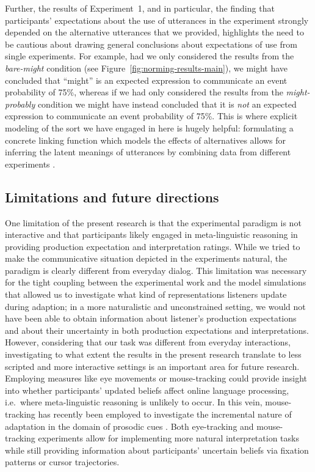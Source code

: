 \documentclass[man, floatsintext]{apa6}
\newcommand{\figref}[1]{Figure~\ref{#1}}
\begin{document}
Further, the results of Experiment~1, and in particular, the finding
that participants' expectations about the use of utterances in the experiment strongly depended on
the alternative utterances that we provided, highlights the need to be cautious about drawing general conclusions about expectations of use from single experiments. For example,
had we only considered the results from the \textit{bare-might} condition (see \figref{fig:norming-results-main}),
we might have concluded that ``might'' is an expected expression to communicate an event probability of 75\%,
whereas if we had only considered the results from the \textit{might-probably} condition we might have instead concluded that it is \emph{not} an expected expression to communicate an event probability of 75\%.
This is where explicit modeling of the sort we have engaged in here is hugely helpful: formulating a concrete linking function which models the effects of 
alternatives allows for inferring the latent meanings of utterances by combining data from different experiments \parencite[see also][for similar approaches]{Franke2014,Peloquin2016}.

\subsection{Limitations and future directions}

One limitation of the present research is that the experimental paradigm is not interactive and that participants likely engaged in meta-linguistic reasoning in providing production expectation and interpretation ratings. While we tried to make the communicative situation depicted in the experiments natural,
the paradigm is clearly different from everyday dialog. This limitation was necessary for the tight coupling between the experimental work
and the model simulations that allowed us to investigate what kind of representations listeners update during adaption; in a more
naturalistic and unconstrained setting, we would not have been able to obtain information about listener's production expectations and about their
uncertainty in both production expectations and interpretations. However, considering that our task was different from everyday interactions, investigating
to what extent the results in the present research translate to less scripted and more interactive settings is an important area for future research. Employing measures like eye movements or mouse-tracking could provide insight into whether participants' updated beliefs affect online language processing, i.e.~where meta-linguistic reasoning is unlikely to occur. In this vein, mouse-tracking has recently been
employed  to investigate the incremental nature of adaptation in the domain of  prosodic cues \parencite{Roettger2019}. Both eye-tracking and mouse-tracking experiments 
allow for implementing more natural interpretation tasks while still providing information about participants' uncertain beliefs via fixation patterns or cursor trajectories.
\end{document}
